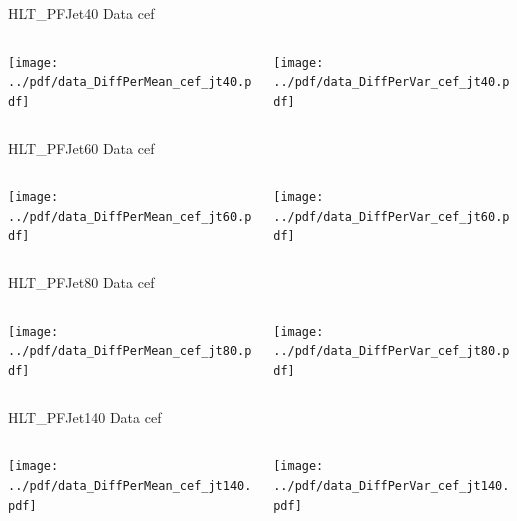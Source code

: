 \documentclass[9pt]{beamer}
\begin{document}
\begin{frame}[t]{HLT\_PFJet40 Data cef}
\begin{columns}[T]
  \begin{column}{.5\textwidth}
  \texttt{[image: ../pdf/data\_DiffPerMean\_cef\_jt40.pdf]}
  \end{column}
  \begin{column}{.5\textwidth}
  \texttt{[image: ../pdf/data\_DiffPerVar\_cef\_jt40.pdf]}
  \end{column}
\end{columns}
\end{frame}

\begin{frame}[t]{HLT\_PFJet60 Data cef}
\begin{columns}[T]
  \begin{column}{.5\textwidth}
  \texttt{[image: ../pdf/data\_DiffPerMean\_cef\_jt60.pdf]}
  \end{column}
  \begin{column}{.5\textwidth}
  \texttt{[image: ../pdf/data\_DiffPerVar\_cef\_jt60.pdf]}
  \end{column}
\end{columns}
\end{frame}

\begin{frame}[t]{HLT\_PFJet80 Data cef}
\begin{columns}[T]
  \begin{column}{.5\textwidth}
  \texttt{[image: ../pdf/data\_DiffPerMean\_cef\_jt80.pdf]}
  \end{column}
  \begin{column}{.5\textwidth}
  \texttt{[image: ../pdf/data\_DiffPerVar\_cef\_jt80.pdf]}
  \end{column}
\end{columns}
\end{frame}

\begin{frame}[t]{HLT\_PFJet140 Data cef}
\begin{columns}[T]
  \begin{column}{.5\textwidth}
  \texttt{[image: ../pdf/data\_DiffPerMean\_cef\_jt140.pdf]}
  \end{column}
  \begin{column}{.5\textwidth}
  \texttt{[image: ../pdf/data\_DiffPerVar\_cef\_jt140.pdf]}
  \end{column}
\end{columns}
\end{frame}
\end{document}
